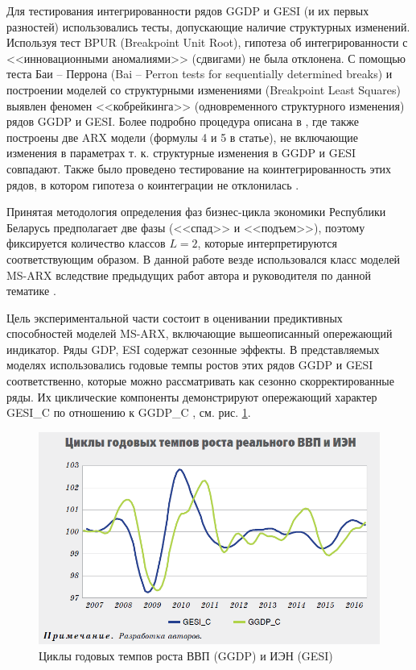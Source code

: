 \documentclass[a4paper,14pt]{extreport}
\begin{document}
Для тестирования интегрированности рядов GGDP и GESI (и их первых разностей) использовались тесты, допускающие наличие структурных изменений. Используя тест BPUR (Breakpoint Unit Root), гипотеза об интегрированности с <<инновационными аномалиями>> (сдвигами) не была отклонена. С помощью теста Баи – Перрона (Bai – Perron tests for sequentially determined breaks) и построении моделей со структурными изменениями (Breakpoint Least Squares) выявлен феномен <<кобрейкинга>> (одновременного структурного изменения) рядов GGDP и GESI. Более подробно процедура описана в \cite{mak_mal_bv_2020}, где также построены две ARX модели (формулы 4 и 5 в статье), не включающие изменения в параметрах т. к.  структурные изменения в GGDP и GESI совпадают. Также было проведено тестирование на коинтегрированность этих рядов, в котором гипотеза о коинтеграции не отклонилась \cite{mak_mal_bv_2020}. 

Принятая методология определения фаз бизнес-цикла экономики Республики Беларусь предполагает две фазы (<<спад>> и <<подъем>>), поэтому фиксируется количество классов $L=2$, которые интерпретируются соответствующим образом. В данной работе везде использовался класс моделей MS-ARX вследствие предыдущих работ автора и руководителя по данной тематике \cite{mak_mal_bv_2018,malVARforCycles}.

Цель экспериментальной части \cite{mak_mal_bv_2020} состоит в оценивании предиктивных способностей моделей MS-ARX, включающие вышеописанный опережающий индикатор. Ряды GDP, ESI содержат сезонные эффекты. В представляемых моделях использовались годовые темпы ростов этих рядов GGDP и GESI соответственно, которые можно рассматривать как сезонно скорректированные ряды. Их циклические компоненты демонстрируют опережающий характер GESI\_C по отношению к GGDP\_C \cite{mak_mal_bv_2020}, см. рис. \ref{fig:bv_ggdp_cycles}.

\begin{figure}[H]
	\includegraphics[width=\linewidth]{img/manual/bv_ggdp_cycles.png}
	\caption{Циклы годовых темпов роста ВВП (GGDP) и ИЭН (GESI)}
	\label{fig:bv_ggdp_cycles}
\end{figure}
\end{document}
